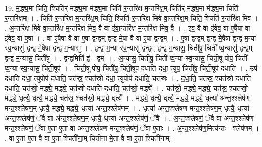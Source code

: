 \documentclass[17pt]{extarticle}
\begin{document}
19. म॒द्ध्य॒मा चिति॒ श्चिति॑र् मद्ध्य॒मा म॑द्ध्य॒मा चिति॑ र॒न्तरि॑क्ष म॒न्तरि॑क्ष॒म् चिति॑र् मद्ध्य॒मा म॑द्ध्य॒मा चिति॑ र॒न्तरि॑क्षम् । . चिति॑ र॒न्तरि॑क्ष म॒न्तरि॑क्ष॒म् चिति॒ श्चिति॑ र॒न्तरि॑क्ष मिवे वा॒न्तरि॑क्ष॒म् चिति॒ श्चिति॑ र॒न्तरि॑क्ष मिव । . अ॒न्तरि॑क्ष मिवे वा॒न्तरि॑क्ष म॒न्तरि॑क्ष मिव॒ वै वा इ॑वा॒न्तरि॑क्ष म॒न्तरि॑क्ष मिव॒ वै । . इ॒व॒ वै वा इ॑वेव॒ वा ए॒षैषा वा इ॑वेव॒ वा ए॒षा । . वा ए॒षैषा वै वा ए॒षा द्व॒न्द्वम् द्व॒न्द्व मे॒षा वै वा ए॒षा द्व॒न्द्वम् । . ए॒षा द्व॒न्द्वम् द्व॒न्द्व मे॒षैषा द्व॒न्द्व म॒न्या स्व॒न्यासु॑ द्व॒न्द्व मे॒षैषा द्व॒न्द्व म॒न्यासु॑ । . द्व॒न्द्व म॒न्या स्व॒न्यासु॑ द्व॒न्द्वम् द्व॒न्द्व म॒न्यासु॒ चिती॑षु॒ चिती᳚ ष्व॒न्यासु॑ द्व॒न्द्वम् द्व॒न्द्व म॒न्यासु॒ चिती॑षु । . द्व॒न्द्वमिति॑ द्वं - द्वम् । . अ॒न्यासु॒ चिती॑षु॒ चिती᳚ ष्व॒न्या स्व॒न्यासु॒ चिती॒षू पोप॒ चिती᳚ ष्व॒न्या स्व॒न्यासु॒ चिती॒षूप॑ । . चिती॒षू पोप॒ चिती॑षु॒ चिती॒षूप॑ दधाति दधा॒ त्युप॒ चिती॑षु॒ चिती॒षूप॑ दधाति । . उप॑ दधाति दधा॒ त्युपोप॑ दधाति॒ चत॑स्र॒ श्चत॑स्रो दधा॒ त्युपोप॑ दधाति॒ चत॑स्रः । . द॒धा॒ति॒ चत॑स्र॒ श्चत॑स्रो दधाति दधाति॒ चत॑स्रो॒ मद्ध्ये॒ मद्ध्ये॒ चत॑स्रो दधाति दधाति॒ चत॑स्रो॒ मद्ध्ये᳚ । . चत॑स्रो॒ मद्ध्ये॒ मद्ध्ये॒ चत॑स्र॒ श्चत॑स्रो॒ मद्ध्ये॒ धृत्यै॒ धृत्यै॒ मद्ध्ये॒ चत॑स्र॒ श्चत॑स्रो॒ मद्ध्ये॒ धृत्यै᳚ । . मद्ध्ये॒ धृत्यै॒ धृत्यै॒ मद्ध्ये॒ मद्ध्ये॒ धृत्या॑ अन्त॒श्श्लेष॑ण मन्त॒श्श्लेष॑ण॒म् धृत्यै॒ मद्ध्ये॒ मद्ध्ये॒ धृत्या॑ अन्त॒श्श्लेष॑णम् । . धृत्या॑ अन्त॒श्श्लेष॑ण मन्त॒श्श्लेष॑ण॒म् धृत्यै॒ धृत्या॑ अन्त॒श्श्लेष॑णं॒ ॅवै वा अ॑न्त॒श्श्लेष॑ण॒म् धृत्यै॒ धृत्या॑ अन्त॒श्श्लेष॑णं॒ ॅवै । . अ॒न्त॒श्श्लेष॑णं॒ ॅवै वा अ॑न्त॒श्श्लेष॑ण मन्त॒श्श्लेष॑णं॒ ॅवा ए॒ता ए॒ता वा अ॑न्त॒श्श्लेष॑ण मन्त॒श्श्लेष॑णं॒ ॅवा ए॒ताः । . अ॒न्त॒श्श्लेष॑ण॒मित्य॑न्तः - श्लेष॑णम् । . वा ए॒ता ए॒ता वै वा ए॒ता श्चिती॑ना॒म् चिती॑ना मे॒ता वै वा ए॒ता श्चिती॑नाम् । \newline
\end{document}
